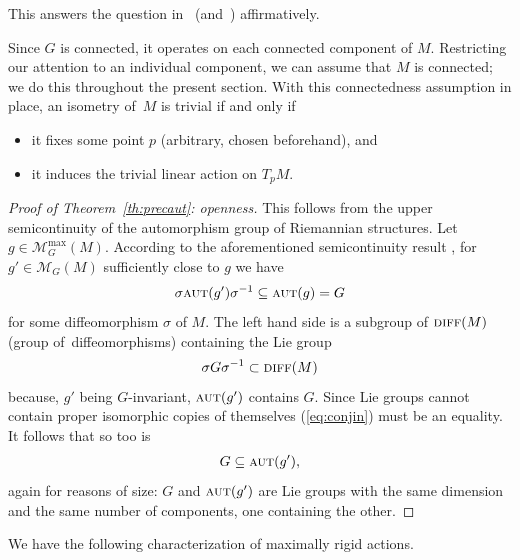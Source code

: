 \documentclass[10pt,a4paper]{amsart}
\numberwithin{equation}{section}
\newcommand{\cat}[1]{\textsc{#1}}
\begin{document}
This answers the question in~\cite[Section~4]{mell} (and~\cite[Question~Q4]{niem}) affirmatively.

\begin{Remark}\label{re:conn}
Since $G$ is connected, it operates on each connected component of $M$. Restricting our attention to an individual component, we can assume that $M$ is connected; we do this throughout the present section. With this connectedness assumption in place, an isometry of~$M$ is trivial if and only if
\begin{itemize}\itemsep=0pt
\item it fixes some point $p$ (arbitrary, chosen beforehand), and
\item it induces the trivial linear action on $T_pM$.
\end{itemize}
\end{Remark}


\begin{proof}[Proof of Theorem~\ref{th:precaut}: openness]
 This follows from the upper semicontinuity of the automorphism group of Riemannian structures. Let $g\in \mathcal{M}_G^{\max}(M)$. According to the aforementioned semicontinuity result \cite[Theorem~8.1]{eb}, for $g'\in \mathcal{M}_G(M)$ sufficiently close to $g$ we have
 \begin{gather}\label{eq:conjin}
 \sigma \cat{aut}(g') \sigma^{-1}\subseteq \cat{aut}(g) = G
 \end{gather}
 for some diffeomorphism $\sigma$ of $M$. The left hand side is a subgroup of $\cat{diff}(M)$ (group of~dif\-feomorphisms) containing the Lie group
 \begin{gather*}
 \sigma G\sigma^{-1} \subset \cat{diff}(M)
 \end{gather*}
 because, $g'$ being $G$-invariant, $\cat{aut}(g')$ contains $G$. Since Lie groups cannot contain proper isomorphic copies of themselves (\ref{eq:conjin}) must be an equality. It follows that so too is
 \begin{gather*}
 G\subseteq \cat{aut}(g'),
 \end{gather*}
 again for reasons of size: $G$ and $\cat{aut}(g')$ are Lie groups with the same dimension and the same number of components, one containing the other.
\end{proof}

We have the following characterization of maximally rigid actions.
\end{document}
